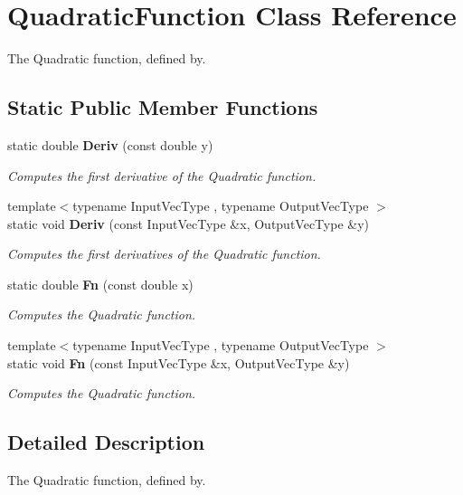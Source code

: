 \section{Quadratic\+Function Class Reference}
\label{classmlpack_1_1ann_1_1QuadraticFunction}


The Quadratic function, defined by.  


\subsection*{Static Public Member Functions}
\begin{DoxyCompactItemize}
\item 
static double \textbf{ Deriv} (const double y)
\begin{DoxyCompactList}\small\item\em Computes the first derivative of the Quadratic function. \end{DoxyCompactList}\item 
{\footnotesize template$<$typename Input\+Vec\+Type , typename Output\+Vec\+Type $>$ }\\static void \textbf{ Deriv} (const Input\+Vec\+Type \&x, Output\+Vec\+Type \&y)
\begin{DoxyCompactList}\small\item\em Computes the first derivatives of the Quadratic function. \end{DoxyCompactList}\item 
static double \textbf{ Fn} (const double x)
\begin{DoxyCompactList}\small\item\em Computes the Quadratic function. \end{DoxyCompactList}\item 
{\footnotesize template$<$typename Input\+Vec\+Type , typename Output\+Vec\+Type $>$ }\\static void \textbf{ Fn} (const Input\+Vec\+Type \&x, Output\+Vec\+Type \&y)
\begin{DoxyCompactList}\small\item\em Computes the Quadratic function. \end{DoxyCompactList}\end{DoxyCompactItemize}


\subsection{Detailed Description}
The Quadratic function, defined by. 

